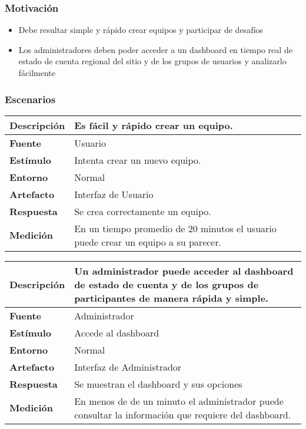 \subsubsection*{Motivación}
\begin{itemize}
\item{Debe resultar simple y rápido crear equipos y participar de desafíos}
\item{Los administradores deben poder acceder a un dashboard en tiempo real de estado de cuenta regional del sitio y de los grupos de usuarios y analizarlo fácilmente}
\end{itemize}

\subsubsection*{Escenarios}
\begin{center}
  \begin{tabular}{| l | p{10cm} | }
    \hline
	\textbf{Descripción} & Es fácil y rápido crear un equipo.\\  \hline
	\textbf{Fuente} & Usuario\\  \hline
	\textbf{Estímulo} & Intenta crear un nuevo equipo.\\  \hline
	\textbf{Entorno} & Normal\\  \hline
	\textbf{Artefacto} & Interfaz de Usuario\\  \hline
	\textbf{Respuesta} & Se crea correctamente un equipo.\\  \hline
	\textbf{Medición} & En un tiempo promedio de 20 minutos el usuario puede crear un equipo a su parecer.\\  \hline
  \end{tabular}
\end{center}


\begin{center}
  \begin{tabular}{| l | p{10cm} | }
    \hline
	\textbf{Descripción} & Un administrador puede acceder al dashboard de estado de cuenta y de los grupos de participantes de manera rápida y simple.\\  \hline
	\textbf{Fuente} & Administrador\\  \hline
	\textbf{Estímulo} & Accede al dashboard\\  \hline
	\textbf{Entorno} & Normal\\  \hline
	\textbf{Artefacto} & Interfaz de Administrador\\  \hline
	\textbf{Respuesta} & Se muestran el dashboard y sus opciones\\  \hline
	\textbf{Medición} & En menos de de un minuto el administrador puede consultar la información que requiere del dashboard.\\  \hline
  \end{tabular}
\end{center}